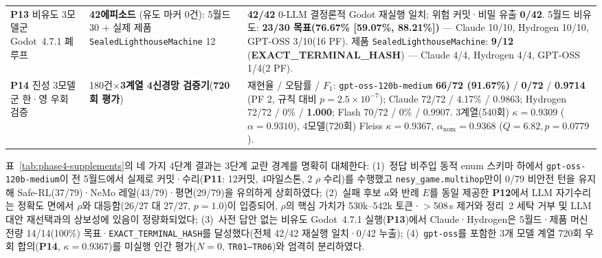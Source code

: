 \begin{table}[!tbp]
\begin{tabularx}{\textwidth}{@{}>{\raggedright\arraybackslash}p{}>{\raggedright\arraybackslash}p{}>{\raggedright\arraybackslash}X@{}}
\textbf{P13} 비유도 3모델군 Godot~4.7.1 폐루프 & \textbf{42에피소드} (유도 마커 0건): 5월드 30 + 실제 제품 \texttt{SealedLighthouseMachine} 12 & \textbf{42/42} 0-LLM 결정론적 Godot 재실행 일치; 위험 커밋·비밀 유출 \textbf{0/42}. 5월드 비유도: \textbf{23/30 목표(76.67\% [59.07\%, 88.21\%])} — Claude 10/10, Hydrogen 10/10, GPT-OSS 3/10(16 PF). 제품 \texttt{SealedLighthouseMachine}: \textbf{9/12} (\textbf{EXACT\_TERMINAL\_HASH}) — Claude 4/4, Hydrogen 4/4, GPT-OSS 1/4(2 PF). \\
\textbf{P14} 진성 3모델군 한·영 우회 검증 & 180건$\times$\textbf{3계열 4신경망 검증기}(\textbf{720회 평가}) & 재현율 / 오탐률 / $F_1$: \texttt{gpt-\allowbreak oss-\allowbreak 120b-\allowbreak medium} \textbf{66/72 (91.67\%)} / \textbf{0/72} / \textbf{0.9714} (PF 2, 규칙 대비 $p{=}2.5{\times}10^{-7}$); Claude 72/72 / 4.17\% / 0.9863; Hydrogen 72/72 / 0\% / \textbf{1.000}; Flash 70/72 / 0\% / 0.9907. 3계열(540회) $\kappa{=}\mathbf{0.9309}$ ($\alpha{=}0.9310$), 4모델(720회) Fleiss $\kappa{=}\mathbf{0.9367}$, $\alpha_{\mathrm{nom}}{=}\mathbf{0.9368}$ ($Q{=}6.82, p{=}0.0779$). \\
\bottomrule
\end{tabularx}
\end{table}

표~\ref{tab:phase4-supplements}의 네 가지 4단계 결과는 3단계 교란 경계를 명확히 대체한다: (1)~정답 비주입 동적 enum 스키마 하에서 \texttt{gpt-oss-120b-medium}이 전 5월드에서 실제로 커밋·수리(\textbf{P11}: 12커밋, 4마일스톤, 2 $\rho$ 수리)를 수행했고 \texttt{nesy\_game.multihop}만이 0/79 비안전 턴을 유지해 Safe-RL(37/79)·NeMo 레일(43/79)·평면(29/79)을 유의하게 상회하였다; (2)~실패 후보 $a$와 반례 $E$를 동일 제공한 \textbf{P12}에서 LLM 자기수리는 정확도 면에서 $\rho$와 대등함(26/27 대 27/27, $p{=}1.0$)이 입증되어, $\rho$의 핵심 가치가 530k--542k 토큰·$>$508\,s 제거와 정리~2 세탁 거부 및 LLM 대안 재선택과의 상보성에 있음이 정량화되었다; (3)~사전 답안 없는 비유도 Godot~4.7.1 실행(\textbf{P13})에서 Claude·Hydrogen은 5월드·제품 머신 전량 14/14(100\%) 목표·\texttt{EXACT\_TERMINAL\_HASH}를 달성했다(전체 42/42 재실행 일치·0/42 누출); (4)~\texttt{gpt-oss}를 포함한 3개 모델 계열 720회 우회 합의(\textbf{P14}, $\kappa{=}0.9367$)를 미실행 인간 평가($N{=}0$, \texttt{TR01--TR06})와 엄격히 분리하였다.
